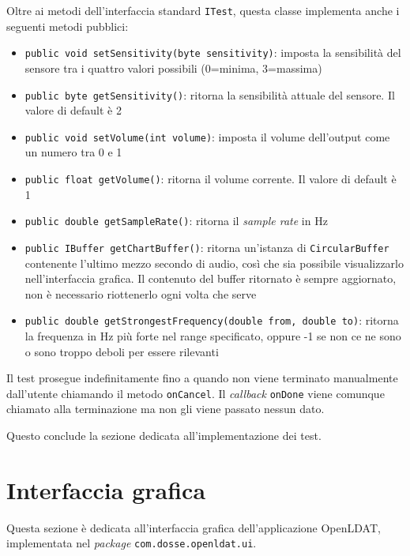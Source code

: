 Oltre ai metodi dell'interfaccia standard \texttt{ITest}, questa classe implementa anche i seguenti metodi pubblici: \begin{itemize}
	\item \texttt{public void setSensitivity(byte sensitivity)}: imposta la sensibilità del sensore tra i quattro valori possibili (0=minima, 3=massima)
	\item \texttt{public byte getSensitivity()}: ritorna la sensibilità attuale del sensore. Il valore di default è 2
	\item \texttt{public void setVolume(int volume)}: imposta il volume dell'output come un numero tra 0 e 1
	\item \texttt{public float getVolume()}: ritorna il volume corrente. Il valore di default è 1
	\item \texttt{public double getSampleRate()}: ritorna il \textit{sample rate} in Hz
	\item \texttt{public IBuffer getChartBuffer()}: ritorna un'istanza di \texttt{CircularBuffer} contenente l'ultimo mezzo secondo di audio, così che sia possibile visualizzarlo nell'interfaccia grafica. Il contenuto del buffer ritornato è sempre aggiornato, non è necessario riottenerlo ogni volta che serve
	\item \texttt{public double getStrongestFrequency(double from, double to)}: ritorna la frequenza in Hz più forte nel range specificato, oppure -1 se non ce ne sono o sono troppo deboli per essere rilevanti
\end{itemize}

Il test prosegue indefinitamente fino a quando non viene terminato manualmente dall'utente chiamando il metodo \texttt{onCancel}. Il \textit{callback} \texttt{onDone} viene comunque chiamato alla terminazione ma non gli viene passato nessun dato.

%
%
%
Questo conclude la sezione dedicata all'implementazione dei test.

\section{Interfaccia grafica}
Questa sezione è dedicata all'interfaccia grafica dell'applicazione OpenLDAT, implementata nel \textit{package} \texttt{com.dosse.openldat.ui}.

